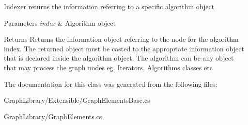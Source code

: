 Indexer returns the information referring to a specific algorithm object 


\begin{DoxyParams}{Parameters}
{\em index} & Algorithm object\\
\hline
\end{DoxyParams}
\begin{DoxyReturn}{Returns}
Returns the information object referring to the node for the algorithm index. The returned object must be casted to the appropriate information object that is declared inside the algorithm object. The algorithm can be any object that may process the graph nodes eg. Iterators, Algorithms classes etc
\end{DoxyReturn}


The documentation for this class was generated from the following files\+:\begin{DoxyCompactItemize}
\item 
Graph\+Library/\+Extensible/Graph\+Elements\+Base.\+cs\item 
Graph\+Library/Graph\+Elements.\+cs\end{DoxyCompactItemize}
